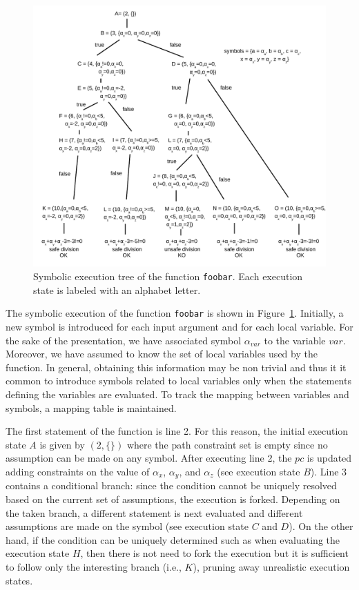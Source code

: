 \documentclass[10pt, a4paper]{article}
\begin{document}
\begin{figure}[t]
  \centering
  \includegraphics[width=1.0\columnwidth]{images/example} 
  \caption{Symbolic execution tree of the function {\tt foobar}. Each execution state is labeled with an alphabet letter.}
  \label{fig:example-symbolic-execution}
\end{figure}

The symbolic execution of the function {\tt foobar} is shown in Figure~\ref{fig:example-symbolic-execution}. Initially, a new symbol is introduced for each input argument and for each local variable. For the sake of the presentation, we have associated symbol $\alpha_{var}$ to the variable $var$. Moreover, we have assumed to know the set of local variables used by the function. In general, obtaining this information may be non trivial and thus it it common to introduce symbols related to local variables only when the statements defining the variables are evaluated. To track the mapping between variables and symbols, a mapping table is maintained. 

The first statement of the function is line 2. For this reason, the initial execution state $A$ is given by $(2, \{\})$ where the path constraint set is empty since no assumption can be made on any symbol. After executing line 2, the $pc$ is updated adding constraints on the value of $\alpha_x$, $\alpha_y$, and $\alpha_z$ (see execution state $B$). Line 3 contains a conditional branch: since the condition cannot be uniquely resolved based on the current set of assumptions, the execution is forked. Depending on the taken branch, a different statement is next evaluated and different assumptions are made on the symbol (see execution state $C$ and $D$). On the other hand, if the condition can be uniquely determined such as when evaluating the execution state $H$, then there is not need to fork the execution but it is sufficient to follow only the interesting branch (i.e., $K$), pruning away unrealistic execution states. 
\end{document}
